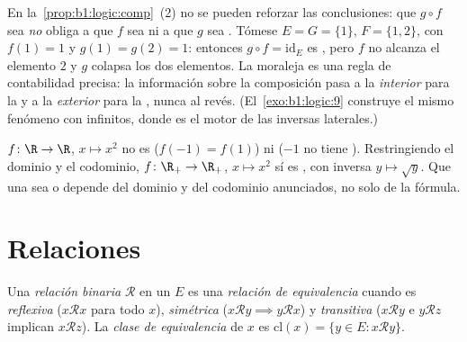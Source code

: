 \begin{example}\label{ex:b1:logic:compsharp}
En la~\cref{prop:b1:logic:comp}~(2) no se pueden reforzar las
conclusiones: que $g \circ f$ sea  \emph{no} obliga a que $f$
sea  ni a que $g$ sea . Tómese $E = G = \{1\}$,
$F = \{1, 2\}$, con $f(1) = 1$ y $g(1) = g(2) = 1$: entonces
$g \circ f = \mathrm{id}_E$ es , pero $f$ no alcanza el
elemento $2$ y $g$ colapsa los dos elementos. La moraleja es una regla
de contabilidad precisa: la información sobre la composición pasa a la
 \emph{interior} para la  y a la \emph{exterior}
para la , nunca al revés. (El~\cref{exo:b1:logic:9}
construye el mismo fenómeno con  infinitos, donde es el motor
de las inversas laterales.)
\end{example}

\begin{example}\label{ex:b1:logic:injexamples}
$f \colon \R \to \R$, $x \mapsto x^2$ no es  ($f(-1) =
f(1)$) ni  ($-1$ no tiene ). Restringiendo
el dominio y el codominio, $f \colon \R_+ \to \R_+$, $x \mapsto x^2$ sí
es , con inversa $y \mapsto \sqrt y$. Que una 
sea  o  depende del dominio y del codominio
anunciados, no solo de la fórmula.
\end{example}

\section{Relaciones}

\begin{definition}\label{def:b1:logic:equiv}
Una \emph{relación binaria} $\mathcal{R}$ en un  $E$ es una
\emph{relación de equivalencia} cuando
es \emph{reflexiva} ($x \mathbin{\mathcal{R}} x$ para todo $x$),
\emph{simétrica} ($x \mathbin{\mathcal{R}} y \implies y
\mathbin{\mathcal{R}} x$) y \emph{transitiva} ($x
\mathbin{\mathcal{R}} y$ e $y \mathbin{\mathcal{R}} z$ implican $x
\mathbin{\mathcal{R}} z$). La \emph{clase de equivalencia} de $x$ es
$\mathrm{cl}(x) = \{y \in E : x \mathbin{\mathcal{R}} y\}$.
\end{definition}

